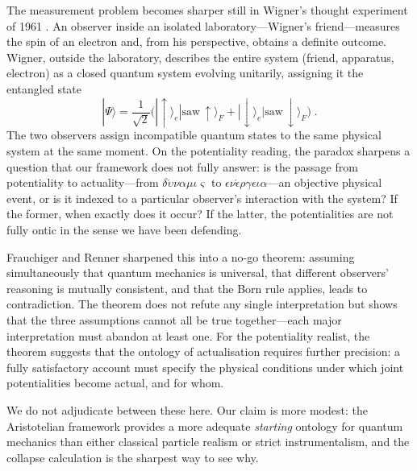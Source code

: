 \label{sec:wigner}

The measurement problem becomes sharper still in Wigner's thought experiment of 1961 \cite{wigner_1961_friend}. An observer inside an isolated laboratory---Wigner's friend---measures the spin of an electron and, from his perspective, obtains a definite outcome. Wigner, outside the laboratory, describes the entire system (friend, apparatus, electron) as a closed quantum system evolving unitarily, assigning it the entangled state
\begin{equation}
  |\Psi\rangle = \frac{1}{\sqrt{2}} \bigl(|\uparrow\rangle_e|\mathrm{saw}\,\uparrow\rangle_F + |\downarrow\rangle_e|\mathrm{saw}\,\downarrow\rangle_F\bigr) \; .
  \label{eq:wigner}
\end{equation}
The two observers assign incompatible quantum states to the same physical system at the same moment. On the potentiality reading, the paradox sharpens a question that our framework does not fully answer: is the passage from potentiality to actuality---from $\delta\acute{\upsilon}\nu\alpha\mu\iota\varsigma$ to $\epsilon\nu\acute{\epsilon}\rho\gamma\epsilon\iota\alpha$---an objective physical event, or is it indexed to a particular observer's interaction with the system? If the former, when exactly does it occur? If the latter, the potentialities are not fully ontic in the sense we have been defending.

\medskip

Frauchiger and Renner \cite{frauchiger_2018_quantum} sharpened this into a no-go theorem: assuming simultaneously that quantum mechanics is universal, that different observers' reasoning is mutually consistent, and that the Born rule applies, leads to contradiction. The theorem does not refute any single interpretation but shows that the three assumptions cannot all be true together---each major interpretation must abandon at least one. For the potentiality realist, the theorem suggests that the ontology of actualisation requires further precision: a fully satisfactory account must specify the physical conditions under which joint potentialities become actual, and for whom.

\medskip

We do not adjudicate between these here. Our claim is more modest: the Aristotelian framework provides a more adequate \textit{starting} ontology for quantum mechanics than either classical particle realism or strict instrumentalism, and the collapse calculation is the sharpest way to see why.

